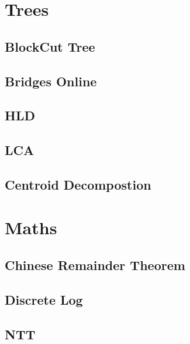 \section{Trees}
\subsection{BlockCut Tree}
\raggedbottom
\subsection{Bridges Online}
\raggedbottom
\subsection{HLD}
\raggedbottom
\subsection{LCA}
\raggedbottom
\subsection{Centroid Decompostion}
\raggedbottom

\section{Maths}
\subsection{Chinese Remainder Theorem}
\raggedbottom
\subsection{Discrete Log}
\raggedbottom
\subsection{NTT}
\raggedbottom
